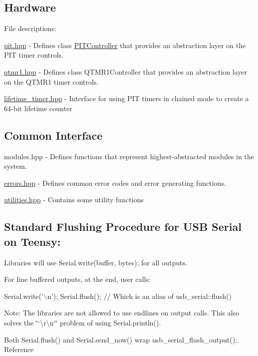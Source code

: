 \subsection*{Hardware}

File descriptions\+:


\begin{DoxyItemize}
\item {\ttfamily \hyperlink{pit_8hpp}{pit.\+hpp}} -\/ Defines {\ttfamily class \hyperlink{classPITController}{P\+I\+T\+Controller}} that provides an abstraction layer on the P\+IT timer controls.
\item {\ttfamily \hyperlink{qtmr1_8hpp}{qtmr1.\+hpp}} -\/ Defines \textquotesingle{}class Q\+T\+M\+R1\+Controller\textquotesingle{} that provides an abstraction layer on the Q\+T\+M\+R1 timer controls.
\item {\ttfamily \hyperlink{lifetime__timer_8hpp}{lifetime\+\_\+timer.\+hpp}} -\/ Interface for using P\+IT timers in chained mode to create a 64-\/bit lifetime counter
\end{DoxyItemize}

\subsection*{Common Interface}


\begin{DoxyItemize}
\item {\ttfamily modules.\+hpp} -\/ Defines functions that represent highest-\/abstracted modules in the system.
\item {\ttfamily \hyperlink{errors_8hpp}{errors.\+hpp}} -\/ Defines common error codes and error generating functions.
\item {\ttfamily \hyperlink{utilities_8hpp}{utilities.\+hpp}} -\/ Contains some utility functions
\end{DoxyItemize}

\subsection*{Standard Flushing Procedure for U\+SB Serial on Teensy\+:}


\begin{DoxyItemize}
\item Libraries will use {\ttfamily Serial.\+write(buffer, bytes);} for all outputs.
\item For line buffered outputs, at the end, user calls\+: 
\begin{DoxyCode}
Serial.write('\(\backslash\)n');
Serial.flush(); // Which is an alias of usb\_serial::flush()
\end{DoxyCode}

\item Note\+: The libraries are not allowed to use endlines on output calls. This also solves the \char`\"{}`\textbackslash{}r\textbackslash{}n`\char`\"{} problem of using {\ttfamily Serial.\+println()}.
\item Both {\ttfamily Serial.\+flush()} and {\ttfamily Serial.\+send\+\_\+now()} wrap {\ttfamily usb\+\_\+serial\+\_\+flush\+\_\+output();}. Reference 
\end{DoxyItemize}

